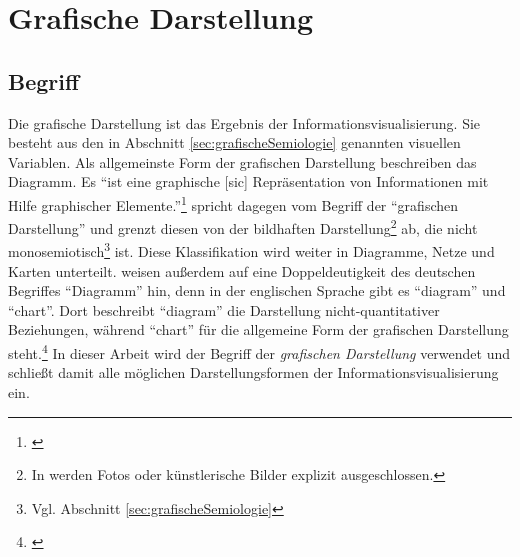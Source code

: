 \documentclass[a4paper, 
               12pt,
               DIV=calc,
               version=first,
               pdftex,
               headsepline,
               footsepline,
               bibtotocnumbered,
               liststotocnumbered]{scrreprt}
\begin{document}
\section{Grafische Darstellung}
\label{sec:Darstellungen}
\subsection{Begriff}
Die grafische Darstellung ist das Ergebnis der Informationsvisualisierung. Sie besteht
aus den in Abschnitt \ref{sec:grafischeSemiologie} genannten
visuellen Variablen.
Als allgemeinste Form der grafischen Darstellung beschreiben \cite{Schumann} das
Diagramm. Es "`ist eine graphische [sic] Repräsentation von Informationen mit Hilfe
graphischer Elemente."'\footnote{\citep[S.\,126]{Schumann}} \cite{Bertin} spricht dagegen
vom Begriff der "`grafischen Darstellung"' und grenzt diesen von
der bildhaften Darstellung\footnote{In \cite{Bertin} werden Fotos oder künstlerische Bilder explizit ausgeschlossen.}
ab, die nicht monosemiotisch\footnote{Vgl. Abschnitt \ref{sec:grafischeSemiologie}} ist.
Diese Klassifikation wird weiter in Diagramme, Netze
und Karten unterteilt. \cite{Schumann} weisen außerdem auf eine Doppeldeutigkeit
des deutschen Begriffes "`Diagramm"' hin, denn in der englischen Sprache gibt es "`diagram"' und "`chart"'.
Dort beschreibt "`diagram"' die Darstellung nicht-quantitativer Beziehungen, während "`chart"' für die
allgemeine Form der grafischen Darstellung steht.\footnote{\citep[S.\,126]{Schumann}}
In dieser Arbeit wird der Begriff der \textit{grafischen Darstellung} verwendet und schließt
damit alle möglichen Darstellungsformen der Informationsvisualisierung ein.
\end{document}
